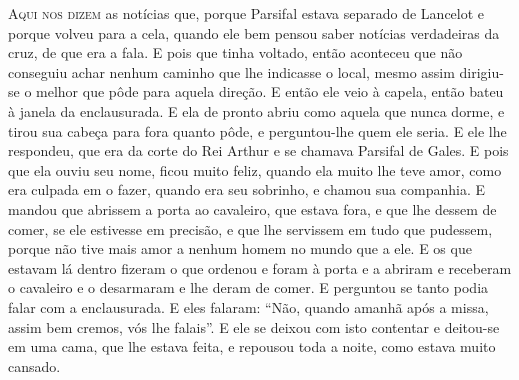 \textsc{Aqui nos dizem} as notícias que, porque Parsifal estava separado de
Lancelot e porque volveu para a cela, quando ele bem pensou saber notícias
verdadeiras da cruz, de que era a fala. E pois que tinha voltado, então
aconteceu que não conseguiu achar nenhum caminho que lhe indicasse o local,
mesmo assim dirigiu-se o melhor que pôde para aquela direção. E então ele veio
à capela, então bateu à janela da enclausurada. E ela de pronto abriu como
aquela que nunca dorme, e tirou sua cabeça para fora quanto pôde, e
perguntou-lhe quem ele seria. E ele lhe respondeu, que era da corte do Rei
Arthur e se chamava Parsifal de Gales. E pois que ela ouviu seu nome, ficou
muito feliz, quando ela muito lhe teve amor, como era culpada em o fazer,
quando era seu sobrinho, e chamou sua companhia. E mandou que abrissem a porta
ao cavaleiro, que estava fora, e que lhe dessem de comer, se ele estivesse em
precisão, e que lhe servissem em tudo que pudessem, porque não tive mais amor a
nenhum homem no mundo que a ele. E os que estavam lá dentro fizeram o que
ordenou e foram à porta e a abriram e receberam o cavaleiro e o desarmaram e
lhe deram de comer. E perguntou se tanto podia falar com a enclausurada. E eles
falaram: “Não, quando amanhã após a missa, assim bem cremos, vós lhe falais”. E
ele se deixou com isto contentar e deitou-se em uma cama, que lhe estava feita,
e repousou toda a noite, como estava muito cansado. 

